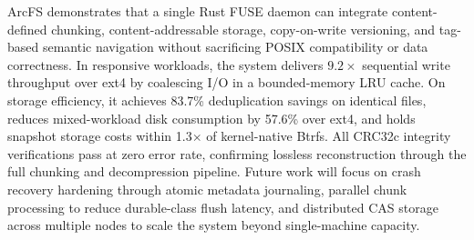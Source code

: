 \documentclass[conference]{IEEEtran}
\begin{document}
ArcFS demonstrates that a single Rust FUSE daemon can integrate
content-defined chunking, content-addressable storage, copy-on-write
versioning, and tag-based semantic navigation without sacrificing POSIX
compatibility or data correctness. In responsive workloads, the system
delivers $9.2\times$ sequential write throughput over ext4 by coalescing
I/O in a bounded-memory LRU cache. On storage efficiency, it achieves
83.7\% deduplication savings on identical files, reduces mixed-workload
disk consumption by 57.6\% over ext4, and holds snapshot storage costs
within 1.3$\times$ of kernel-native Btrfs. All CRC32c integrity
verifications pass at zero error rate, confirming lossless reconstruction
through the full chunking and decompression pipeline. Future work will
focus on crash recovery hardening through atomic metadata journaling,
parallel chunk processing to reduce durable-class flush latency,
and distributed CAS storage across multiple nodes to scale the system
beyond single-machine capacity.

\balance


\end{document}
